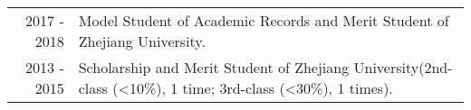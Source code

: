 %
%





\begin{tabular}{rl}	
	\textsc{2017 - 2018} & Model Student of Academic Records and Merit Student of Zhejiang University.\\
	\textsc{2013 - 2015} & Scholarship and Merit Student of Zhejiang University(2nd-class (<10\%), 1 time; 3rd-class (<30\%), 1 times).\\	
\end{tabular}